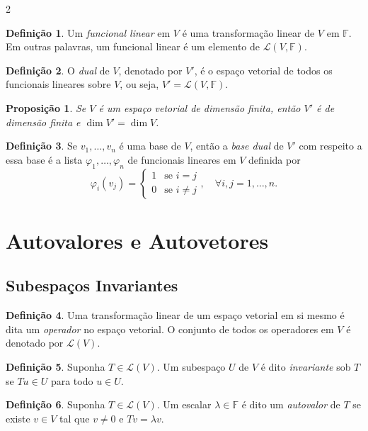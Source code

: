 \documentclass{article}
\theoremstyle{plain}
\newtheorem{prop}[thm]{Proposição}
\theoremstyle{definition}
\newtheorem{defn}{Definição}[section]
\theoremstyle{remark}
\begin{document}
\begin{multicols}{2}
\begin{defn}
    Um \emph{funcional linear} em \(V\) é uma transformação linear de \(V\) em \(\mathbb{F}\). Em outras palavras, um funcional linear é um elemento de \(\mathcal{L}(V, \mathbb{F})\).
\end{defn}

\begin{defn}
    O \emph{dual} de \(V\), denotado por \(V'\), é o espaço vetorial de todos os funcionais lineares sobre \(V\), ou seja, \(V' = \mathcal{L}(V, \mathbb{F})\).
\end{defn}

\begin{prop}
    Se \(V\) é um espaço vetorial de dimensão finita, então \(V'\) é de dimensão finita e \(\dim V' = \dim V\).
\end{prop}

\begin{defn}
    Se \(v_1, \ldots, v_n\) é uma base de \(V\), então a \emph{base dual} de \(V'\) com respeito a essa base é a lista \(\varphi_1, \ldots, \varphi_n\) de funcionais lineares em \(V\) definida por
    \[
        \varphi_i(v_j) = \begin{cases}
            1 & \text{se } i = j \\
            0 & \text{se } i \neq j
        \end{cases}, \quad \forall i,j = 1,\ldots,n.
    \]
\end{defn}

\section{Autovalores e Autovetores}
\subsection{Subespaços Invariantes}

\begin{defn}
    Uma transformação linear de um espaço vetorial em si mesmo é dita um \emph{operador} no espaço vetorial. O conjunto de todos os operadores em \(V\) é denotado por \(\mathcal{L}(V)\).    
\end{defn}

\begin{defn}
    Suponha \(T \in \mathcal{L}(V)\). Um subespaço \(U\) de \(V\) é dito \emph{invariante} sob \(T\) se \(Tu \in U\) para todo \(u \in U\).
\end{defn}

\begin{defn}
    Suponha \(T \in \mathcal{L}(V)\). Um escalar \(\lambda \in \mathbb{F}\) é dito um \emph{autovalor} de \(T\) se existe \(v \in V\) tal que \(v \neq 0\) e \(Tv = \lambda v\). 
\end{defn}


\end{multicols}
\end{document}
